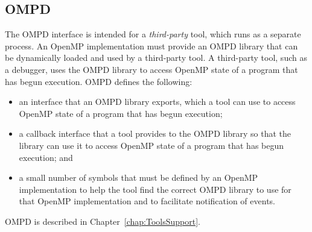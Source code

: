 \subsection{OMPD}

The OMPD interface is intended for a \emph{third-party} tool, which runs as a separate process.
An OpenMP implementation must provide an OMPD
library that can be dynamically loaded and used by a third-party tool.
A third-party tool, such as a debugger, uses the OMPD library
to access
OpenMP state of a program that has begun execution.
OMPD defines the following:

\begin{itemize}
\item
  an interface that an OMPD library exports, which a
  tool can use to access OpenMP state of a program that has begun execution;
  \item
  a callback interface that a tool provides to the
  OMPD library so that the library can use it to access
 OpenMP state of a program that has begun execution; and
\item
  a small number of symbols that must be defined by an OpenMP implementation
  to help the tool find the correct OMPD library to use
  for that OpenMP implementation and to facilitate notification
  of events.
\end{itemize}
OMPD is described in Chapter~\ref{chap:ToolsSupport}.

